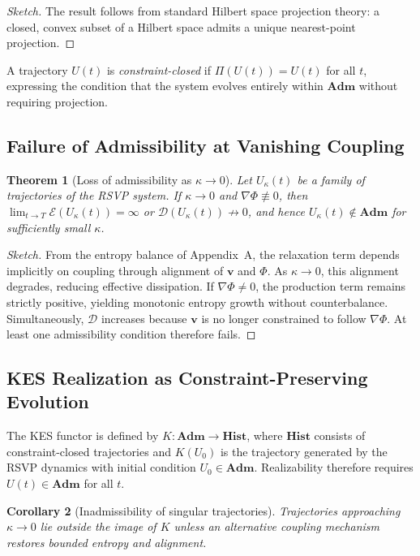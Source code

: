 \documentclass[11pt, a4paper]{article}
\theoremstyle{plain}
\newtheorem{theorem}{Theorem}[section]
\newtheorem{corollary}[theorem]{Corollary}
\theoremstyle{definition}
\newcommand{\Phifield}{\Phi}
\newcommand{\vfield}{\mathbf{v}}
\newcommand{\Adm}{\mathbf{Adm}}
\newcommand{\Hist}{\mathbf{Hist}}
\newcommand{\KES}{K}
\newcommand{\coupling}{\kappa}
\begin{document}
\begin{proof}[Sketch]
The result follows from standard Hilbert space projection theory: a closed,
convex subset of a Hilbert space admits a unique nearest-point projection.
\end{proof}

A trajectory $U(t)$ is \emph{constraint-closed} if $\Pi(U(t)) = U(t)$ for all $t$,
expressing the condition that the system evolves entirely within $\Adm$ without
requiring projection.

\subsection{Failure of Admissibility at Vanishing Coupling}

\begin{theorem}[Loss of admissibility as $\coupling \to 0$]
\label{thm:adm_failure}
Let $U_\coupling(t)$ be a family of trajectories of the RSVP system.
If $\coupling \to 0$ and $\nabla \Phifield \not\equiv 0$, then
$\lim_{t \to T} \mathcal{E}(U_\coupling(t)) = \infty$ or
$\mathcal{D}(U_\coupling(t)) \not\to 0$,
and hence $U_\coupling(t) \notin \Adm$ for sufficiently small $\coupling$.
\end{theorem}

\begin{proof}[Sketch]
From the entropy balance of Appendix~A, the relaxation term depends implicitly
on coupling through alignment of $\vfield$ and $\Phifield$. As $\coupling \to 0$,
this alignment degrades, reducing effective dissipation. If $\nabla \Phifield \neq 0$,
the production term remains strictly positive, yielding monotonic entropy growth
without counterbalance. Simultaneously, $\mathcal{D}$ increases because $\vfield$
is no longer constrained to follow $\nabla \Phifield$. At least one admissibility
condition therefore fails.
\end{proof}

\subsection{KES Realization as Constraint-Preserving Evolution}

The KES functor is defined by $\KES : \Adm \to \Hist$, where $\Hist$ consists
of constraint-closed trajectories and $\KES(U_0)$ is the trajectory generated
by the RSVP dynamics with initial condition $U_0 \in \Adm$. Realizability
therefore requires $U(t) \in \Adm$ for all $t$.

\begin{corollary}[Inadmissibility of singular trajectories]
Trajectories approaching $\coupling \to 0$ lie outside the image of $\KES$
unless an alternative coupling mechanism restores bounded entropy and alignment.
\end{corollary}
\end{document}
